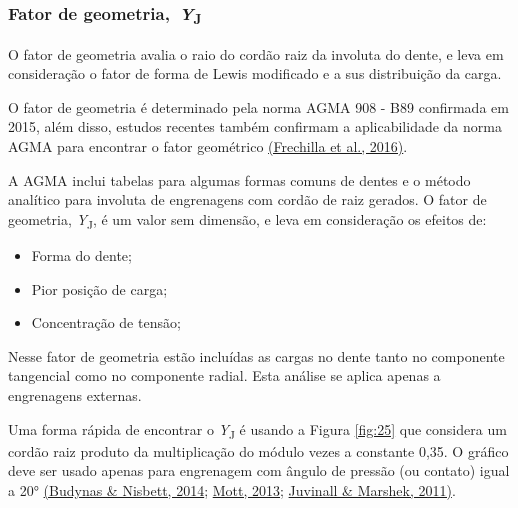 \documentclass[12pt,a4paper]{article}
\providecommand{\tightlist}{\setlength{\itemsep}{0pt}\setlength{\parskip}{0pt}}%
\begin{document}
\subsubsection*{\texorpdfstring{Fator de geometria,~\emph{Y}\textsubscript{J}}{Fator de geometria,~YJ}}

{\label{fator-de-geometria-yj}}

O fator de geometria avalia o raio do cordão raiz da involuta do dente,
e leva em consideração o fator de forma de Lewis modificado e a sus
distribuição da carga.

O fator de geometria é determinado pela norma AGMA 908 - B89 confirmada
em 2015, além disso, estudos recentes também confirmam a aplicabilidade
da norma AGMA para encontrar o fator geométrico \hyperref[csl:26]{(Frechilla et al., 2016)}.

A AGMA inclui tabelas para algumas formas comuns de dentes e o método
analítico para involuta de engrenagens com cordão de raiz gerados. O
fator de geometria, \emph{Y}\textsubscript{J}, é um valor sem dimensão,
e leva em consideração os efeitos de:

\begin{itemize}
\tightlist
\item
  Forma do dente;
\item
  Pior posição de carga;
\item
  Concentração de tensão;
\end{itemize}

Nesse fator de geometria estão incluídas as cargas no dente tanto no
componente tangencial como no componente radial. Esta análise se aplica
apenas a engrenagens externas.

Uma forma rápida de encontrar o \emph{Y}\textsubscript{J} é usando a
Figura {\ref{fig:25}} que considera um cordão raiz
produto da multiplicação do módulo vezes a constante 0,35. O gráfico
deve ser usado apenas para engrenagem com ângulo de pressão (ou contato)
igual a 20° \hyperref[csl:20]{(Budynas \& Nisbett, 2014}; \hyperref[csl:21]{Mott, 2013}; \hyperref[csl:27]{Juvinall \& Marshek, 2011)}.
\end{document}
